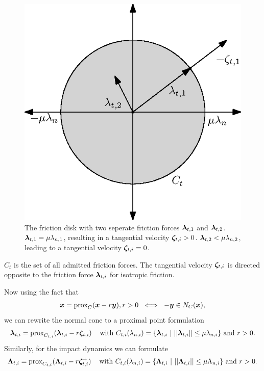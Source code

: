 \documentclass[../DC2017114Bouma.tex]{subfiles}
\begin{document}
\begin{figure}[h]
\centering
\includegraphics[width=.4\textwidth]{frictiondisk.eps}\caption{The friction disk with two seperate friction forces $\boldsymbol{\lambda}_{t,1}$ and $\boldsymbol{\lambda}_{t,2}$. $\boldsymbol{\lambda}_{t,1} = \mu\lambda_{n,1}$, resulting in a tangential velocity $\boldsymbol{\zeta}_{t,i}>0$. $\boldsymbol{\lambda}_{t,2}<\mu\lambda_{n,2}$, leading to a tangential velocity $\boldsymbol{\zeta}_{t,i}=0$.}\label{fig:frictiondisk}
\end{figure}

$C_t$ is the set of all admitted friction forces. The tangential velocity $\boldsymbol{\zeta}_{t,i}$ is directed opposite to the friction force $\boldsymbol{\lambda}_{t,i}$ for isotropic friction. 

Now using the fact that
\begin{align}
{\boldsymbol{x}} = \operatorname{\text{prox}}_C({\boldsymbol{x}} -r{\boldsymbol{y}}), r > 0\ \iff\ -{\boldsymbol{y}}\in N_C({\boldsymbol{x}}),
\end{align}
we can rewrite the normal cone to a proximal point formulation
\begin{align}
\boldsymbol{\lambda}_{t,i} = \operatorname{\text{prox}}_{C_{t,i}}(\boldsymbol{\lambda}_{t,i} - r\boldsymbol{\zeta}_{t,i})\,\quad\text{with }C_{t,i}(\lambda_{n,i}) = \{\boldsymbol{\lambda}_{t,i}\ |\ ||\boldsymbol{\lambda}_{t,i}|| \leq \mu\lambda_{n,i}\}\text{ and }r>0.
\end{align}
Similarly, for the impact dynamics we can formulate
\begin{align}
\boldsymbol{\Lambda}_{t,i} = \operatorname{\text{prox}}_{C_{t,i}}(\boldsymbol{\Lambda}_{t,i} - r\boldsymbol{\zeta}^+_{t,i})\,\quad \text{with }C_{t,i}(\lambda_{n,i}) = \{\boldsymbol{\Lambda}_{t,i}\ |\ ||\boldsymbol{\Lambda}_{t,i}|| \leq \mu\Lambda_{n,i}\}\text{ and }r>0.
\end{align}
\end{document}
